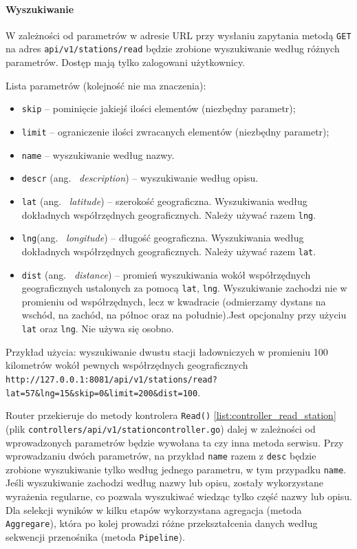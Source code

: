 \paragraph{Wyszukiwanie\newline}
W zależności od parametrów w adresie URL przy wysłaniu zapytania metodą \texttt{GET} na adres \texttt{api/v1/stations/read} będzie zrobione wyszukiwanie według różnych parametrów.
Dostęp mają tylko zalogowani użytkownicy.

Lista parametrów (kolejność nie ma znaczenia):
\begin{itemize}
    \item \texttt{skip} -- pominięcie jakiejś ilości elementów (niezbędny parametr);
    \item \texttt{limit} -- ograniczenie ilości zwracanych elementów (niezbędny parametr);
    \item \texttt{name} -- wyszukiwanie według nazwy.
    \item \texttt{descr} (ang. ~\emph{description}) -- wyszukiwanie według opisu.
    \item \texttt{lat} (ang. ~\emph{latitude}) -- szerokość geograficzna. Wyszukiwania według dokładnych współrzędnych geograficznych. Należy używać razem \texttt{lng}.
    \item \texttt{lng}(ang. ~\emph{longitude}) -- długość geograficzna. Wyszukiwania według dokładnych współrzędnych geograficznych. Należy używać razem \texttt{lat}.
    \item \texttt{dist} (ang. ~\emph{distance}) -- promień wyszukiwania wokół współrzędnych geograficznych ustalonych za pomocą \texttt{lat}, \texttt{lng}. Wyszukiwanie zachodzi nie w promieniu od współrzędnych, lecz w kwadracie (odmierzamy dystans na wschód, na zachód, na północ oraz na południe).Jest opcjonalny przy użyciu \texttt{lat} oraz \texttt{lng}. Nie używa się osobno.
\end{itemize}

Przykład użycia: wyszukiwanie dwustu stacji ładowniczych w promieniu 100 kilometrów wokół pewnych współrzędnych geograficznych \texttt{http://127.0.0.1:8081/api/v1/stations/read?lat=57\&lng=15\&skip=0\&limit=200\&dist=100}.

Router przekieruje do metody kontrolera \texttt{Read()} \ref{list:controller_read_station} (plik \texttt{controllers/api/v1/stationcontroller.go}) dalej w zależności od wprowadzonych parametrów będzie wywołana ta czy inna metoda serwisu.
Przy wprowadzaniu dwóch parametrów, na przykład \texttt{name} razem z \texttt{desc} będzie zrobione wyszukiwanie tylko według jednego parametru, w tym przypadku \texttt{name}. Jeśli wyszukiwanie zachodzi według nazwy lub opisu, zostały wykorzystane wyrażenia regularne, co pozwala wyszukiwać wiedząc tylko część nazwy lub opisu.
Dla selekcji wyników w kilku etapów wykorzystana agregacja (metoda \texttt{Aggregare}), która po kolej prowadzi różne przekształcenia danych według sekwencji przenośnika (metoda \texttt{Pipeline}).

